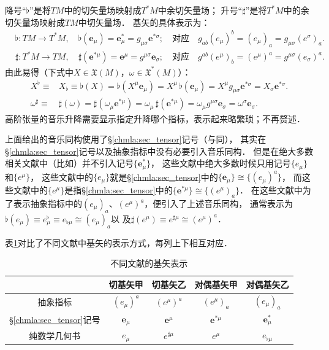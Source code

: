降号“$\flat$”是将$TM$中的切矢量场映射成$T^*M$中余切矢量场；
升号“$\sharp$”是将$T^*M$中的余切矢量场映射成$TM$中切矢量场．
基矢的具体表示为：
\begin{align*}
	&\flat: TM \to T^*M, \quad \flat(\boldsymbol{e}_\mu) 
	= \boldsymbol{e}_\mu^{*}=g_{\mu \sigma}\boldsymbol{e}^{*\sigma} ;
	\quad \text{对应}\quad
	g_{ab} (e_\mu)^b = (e_\mu)_a =  g_{\mu \sigma} (e^\sigma)_a . \\
	&\sharp: T^*M \to TM, \quad \sharp(\boldsymbol{e}^{*\mu})  
	= \boldsymbol{e}^\mu=g^{\mu \sigma}\boldsymbol{e}_{\sigma} ;
	\quad \text{对应}\quad
	g^{ab} (e^\mu)_b  = (e^\mu)^a=  g^{\mu \sigma} (e_\sigma)^a .
\end{align*}
由此易得（下式中$X\in \mathfrak{X}(M)$，$\omega \in \mathfrak{X}^*(M)$）：
\begin{align*}
	X^{\flat} \equiv& X_{\flat} \equiv \flat(X) = \flat (X^\mu \boldsymbol{e}_\mu) = X^\mu \,  \flat ( \boldsymbol{e}_\mu)
	=X^\mu g_{\mu \sigma}\boldsymbol{e}^{*\sigma} = X_\sigma \boldsymbol{e}^{*\sigma}. \\
	\omega^{\sharp} \equiv& \sharp(\omega) = \sharp(\omega_\mu \boldsymbol{e}^{*\mu})
	= \omega_\mu \,  \sharp( \boldsymbol{e}^{*\mu}) = \omega_\mu g^{\mu \sigma}\boldsymbol{e}_{\sigma}
	=\omega^\sigma \boldsymbol{e}_{\sigma}.
\end{align*}
高阶张量的音乐升降需要显示指定升降哪个指标，表示起来略繁琐；不再赘述．

上面给出的音乐同构使用了\S\ref{chmla:sec_tensor}记号（与\parencite{cc2001-zh}同），
其实在\S\ref{chmla:sec_tensor}记号以及抽象指标中没有必要引入音乐同构．
但是在{\kaishu 绝大多数}相关文献中（比如\parencite{chen-li-2023-2ed-v1,
	lee-2018-irm,tu-IM-2011}）并不引入记号$\{\boldsymbol{e}_\mu^{*}\}$，
这些文献中绝大多数时候只用记号$\{{e}_\mu\}$和$\{{e}^{\mu}\}$，
这些文献中的$\{{e}_\mu\}$就是\S\ref{chmla:sec_tensor}中的$\{\boldsymbol{e}_\mu\}\cong \{(e_\mu)^a\}$，
而这些文献中的$\{{e}^{\mu}\}$是指\S\ref{chmla:sec_tensor}中的$\{\boldsymbol{e}^{*\mu}\}\cong \{(e^\mu)_a\}$．
在这些文献中为了表示抽象指标中的$(e_\mu)_a$、$(e^\mu)^a$，便引入了上述音乐同构，
通常表示为$\flat(e_\mu) \equiv {e}_\mu^\flat \equiv {e}_{\flat \mu} \cong (e_\mu)_a$以
及$\sharp(e^\mu)\equiv {e}^{\sharp \mu} \cong (e^\mu)^a$．


表\ref{chrg:tab-base}对比了不同文献中基矢的表示方式，每列上下相互对应．

\begin{table}[htb]
	\centering
	\caption{不同文献的基矢表示} \label{chrg:tab-base}
	\begin{tabular}{|*5{c|}}
		\hline
		{} & 切基矢甲 & 切基矢乙 & 对偶基矢甲 & 对偶基矢乙 \\ \hline
		抽象指标 & $(e_\mu)^a $ & $ (e^\mu)^a$  & $(e^\mu)_a$ & $(e_\mu)_a$ \\ \hline
		\S\ref{chmla:sec_tensor}记号 & $\boldsymbol{e}_{\mu}$& $\boldsymbol{e}^{\mu}$ 
		& $\boldsymbol{e}^{*\mu}$& $ \boldsymbol{e}^{*}_{\mu}$ \\ \hline
		纯数学几何书 & ${e}_\mu$ & $ {e}^{\sharp \mu}$ 
		& ${e}^\mu $ & ${e}_{\flat \mu} $  	\\ \hline
	\end{tabular}
\end{table}

